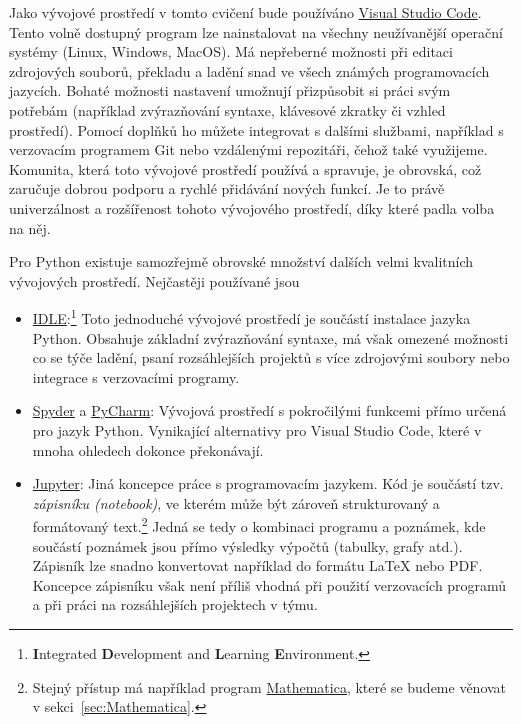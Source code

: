 \documentclass[a4paper,11pt,twoside]{article}
\def\abbreviation#1{\textnormal{\textsc{#1}}}
\theoremstyle{red}
\theoremstyle{green}
\begin{document}
        Jako vývojové prostředí v tomto cvičení bude používáno \href{https://code.visualstudio.com/}{Visual Studio Code}.
        Tento volně dostupný program lze nainstalovat na všechny neužívanější operační systémy (Linux, Windows, MacOS).    
        Má nepřeberné možnosti při editaci zdrojových souborů, překladu a ladění snad ve všech známých programovacích jazycích.
        Bohaté možnosti nastavení umožnují přizpůsobit si práci svým potřebám (například zvýrazňování syntaxe, klávesové zkratky či vzhled prostředí).
        Pomocí doplňků ho můžete integrovat s dalšími službami, například s verzovacím programem Git nebo vzdálenými repozitáři, čehož také využijeme.
        Komunita, která toto vývojové prostředí používá a spravuje, je obrovská, což zaručuje dobrou podporu a rychlé přidávání nových funkcí.
        Je to právě univerzálnost a rozšířenost tohoto vývojového prostředí, díky které padla volba na něj.
        
        Pro Python existuje samozřejmě obrovské množství dalších velmi kvalitních vývojových prostředí. 
        Nejčastěji používané jsou
        \begin{itemize}
            \item \abbreviation{\href{https://docs.python.org/3/library/idle.html}{IDLE}}:\footnote{
                {\bf I}ntegrated {\bf D}evelopment and {\bf L}earning {\bf E}nvironment.
            } 
                Toto jednoduché vývojové prostředí je součástí instalace jazyka Python.
                Obsahuje základní zvýrazňování syntaxe, má však omezené možnosti co se týče ladění, psaní rozsáhlejších projektů s více zdrojovými soubory nebo integrace s verzovacími programy.
            \item \href{https://www.spyder-ide.org/}{Spyder} a \href{https://www.jetbrains.com/pycharm/}{PyCharm}:
                Vývojová prostředí s pokročilými funkcemi přímo určená pro jazyk Python.
                Vynikající alternativy pro Visual Studio Code, které v mnoha ohledech dokonce překonávají.
            
            \item \href{https://jupyter.org/}{Jupyter}: 
                Jiná koncepce práce s programovacím jazykem.
                Kód je součástí tzv. \emph{zápisníku (notebook)}, ve kterém může být zároveň strukturovaný a formátovaný text.\footnote{Stejný přístup má například program \href{https://www.wolfram.com/mathematica/}{Mathematica}, které se budeme věnovat v sekci~\ref{sec:Mathematica}.}
                Jedná se tedy o kombinaci programu a poznámek, kde součástí poznámek jsou přímo výsledky výpočtů (tabulky, grafy atd.).
                Zápisník lze snadno konvertovat například do formátu LaTeX nebo PDF.
                Koncepce zápisníku však není příliš vhodná při použití verzovacích programů a při práci na rozsáhlejších projektech v týmu.
        \end{itemize}
\end{document}
